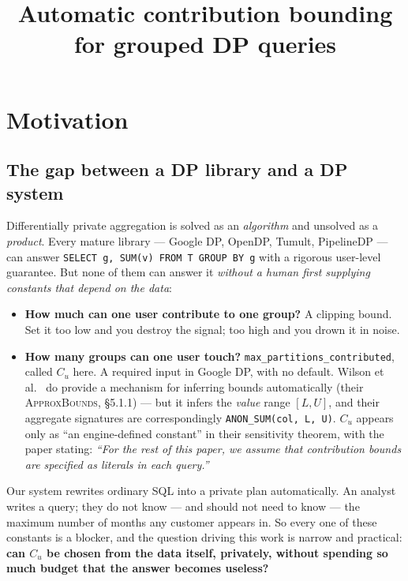 \documentclass[11pt,a4paper]{article}
\title{\vspace{-1.5cm}Automatic contribution bounding for grouped DP queries}
\author{}
\date{}
\newcommand{\Cu}{C_u}
\begin{document}
\maketitle
\vspace{-1.2cm}

\section{Motivation}

\subsection{The gap between a DP library and a DP system}

Differentially private aggregation is solved as an \emph{algorithm} and unsolved as a
\emph{product}. Every mature library --- Google DP, OpenDP, Tumult, PipelineDP --- can answer
\texttt{SELECT g, SUM(v) FROM T GROUP BY g} with a rigorous user-level guarantee. But none of them
can answer it \emph{without a human first supplying constants that depend on the data}:

\begin{itemize}
\item \textbf{How much can one user contribute to one group?} A clipping bound. Set it too low and
you destroy the signal; too high and you drown it in noise.
\item \textbf{How many groups can one user touch?} \texttt{max\_partitions\_contributed}, called
$\Cu$ here. A required input in Google DP, with no default. Wilson et
al.~\cite{wilson2020} do provide a mechanism for inferring bounds automatically (their
\textsc{ApproxBounds}, \S5.1.1) --- but it infers the \emph{value} range $[L,U]$, and their
aggregate signatures are correspondingly \texttt{ANON\_SUM(col, L, U)}. $\Cu$ appears only as
``an engine-defined constant'' in their sensitivity theorem, with the paper stating: \emph{``For the
rest of this paper, we assume that contribution bounds are specified as literals in each query.''}
\end{itemize}

Our system rewrites ordinary SQL into a private plan automatically. An analyst writes a query; they
do not know --- and should not need to know --- the maximum number of months any customer appears
in. So every one of these constants is a blocker, and the question driving this work is narrow and
practical: \textbf{can $\Cu$ be chosen from the data itself, privately, without spending so much
budget that the answer becomes useless?}
\end{document}
